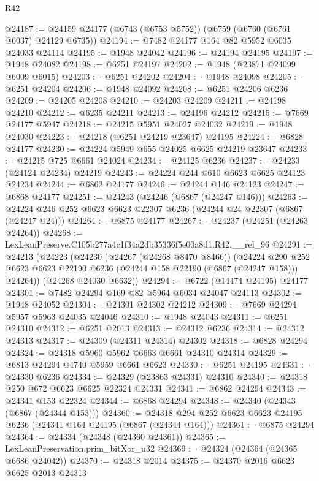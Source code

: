 \begin{lexlean}{R42}
\begin{coremodule}
{@24187 := @24159 @24177 (@6743 (@6753 @5752)) (@6759 (@6760 (@6761 @6037) @24129 @6735))
@24194 := @7482 @24177 @164 @82 @5952 @6035 @24033 @24114
@24195 := @1948 @24042
@24196 := @24194 @24195
@24197 := @1948 @24082
@24198 := @6251 @24197
@24202 := @1948 (@23871 @24099 @6009 @6015)
@24203 := @6251 @24202
@24204 := @1948 @24098
@24205 := @6251 @24204
@24206 := @1948 @24092
@24208 := @6251 @24206 @6236
@24209 := @24205 @24208
@24210 := @24203 @24209
@24211 := @24198 @24210
@24212 := @6235 @24211
@24213 := @24196 @24212
@24215 := @7669 @24177 @5947
@24218 := @24215 @5951 @24027 @24032
@24219 := @1948 @24030
@24223 := @24218 (@6251 @24219 @23647) @24195
@24224 := @6828 @24177
@24230 := @24224 @5949 @655 @24025 @6625 @24219 @23647
@24233 := @24215 @725 @6661 @24024
@24234 := @24125 @6236
@24237 := @24233 (@24124 @24234) @24219
@24243 := @24224 @244 @610 @6623 @6625 @24123 @24234
@24244 := @6862 @24177
@24246 := @24244 @146 @24123
@24247 := @6868 @24177
@24251 := @24243 (@24246 (@6867 (@24247 @146)))
@24263 := @24224 @246 @252 @6623 @6623 @22307 @6236 (@24244 @24 @22307 (@6867 (@24247 @24)))
@24264 := @6875 @24177
@24267 := @24237 (@24251 (@24263 @24264))
@24268 := LexLeanPreserve.C105b277a4c1f34a2db35336f5e00a8d1.R42.__rel_96
@24291 := @24213
    (@24223
      (@24230
        (@24267 (@24268 @8470 @8466))
        (@24224
          @290
          @252
          @6623
          @6623
          @22190
          @6236
          (@24244 @158 @22190 (@6867 (@24247 @158)))
          @24264))
      (@24268 @24030 @6632))
@24294 := @6722 (@14474 @24195) @24177
@24301 := @7482 @24294 @169 @82 @5964 @6034 @24047 @24113
@24302 := @1948 @24052
@24304 := @24301 @24302 @24212
@24309 := @7669 @24294 @5957 @5963 @24035 @24046
@24310 := @1948 @24043
@24311 := @6251 @24310
@24312 := @6251 @2013
@24313 := @24312 @6236
@24314 := @24312 @24313
@24317 := @24309 (@24311 @24314) @24302
@24318 := @6828 @24294
@24324 := @24318 @5960 @5962 @6663 @6661 @24310 @24314
@24329 := @6813 @24294 @4740 @5959 @6661 @6623
@24330 := @6251 @24195
@24331 := @24330 @6236
@24334 := @24329 (@23863 @24331) @24310
@24340 := @24318 @250 @672 @6623 @6625 @22324 @24331
@24341 := @6862 @24294
@24343 := @24341 @153 @22324
@24344 := @6868 @24294
@24348 := @24340 (@24343 (@6867 (@24344 @153)))
@24360 := @24318 @294 @252 @6623 @6623 @24195 @6236 (@24341 @164 @24195 (@6867 (@24344 @164)))
@24361 := @6875 @24294
@24364 := @24334 (@24348 (@24360 @24361))
@24365 := LexLeanPreservation.prim_bitXor_u32
@24369 := @24324 (@24364 (@24365 @6686 @24042))
@24370 := @24318 @2014
@24375 := @24370 @2016 @6623 @6625 @2013 @24313
}
\end{coremodule}
\end{lexlean}
